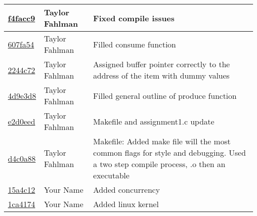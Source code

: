 \begin{tabular}{l l l}
\href{git@github.com:fahlmant/cs444/commit/f4facc9d5a16eb42168ac97078b0f487a08a407c}{f4facc9} & Taylor Fahlman & Fixed compile issues\\\hline
\href{git@github.com:fahlmant/cs444/commit/607fa54aeb02833e23feaaebe3ca42504e86a20c}{607fa54} & Taylor Fahlman & Filled consume function\\\hline
\href{git@github.com:fahlmant/cs444/commit/2244c720455b015276a94f97610bd3e710e41705}{2244c72} & Taylor Fahlman & Assigned buffer pointer correctly to the address of the item with dummy values\\\hline
\href{git@github.com:fahlmant/cs444/commit/4d9e3d84c0309caf5af3ca5aed2af08010b2ef85}{4d9e3d8} & Taylor Fahlman & Filled general outline of produce function\\\hline
\href{git@github.com:fahlmant/cs444/commit/e2d0eedfaec7397cf59d7f1fd46886026f0f1727}{e2d0eed} & Taylor Fahlman & Makefile and assignment1.c update\\\hline
\href{git@github.com:fahlmant/cs444/commit/d4c0a889450f5e33eeee262f56cea203a29aed0a}{d4c0a88} & Taylor Fahlman & Makefile:     Added make file will the most common flags for style and debugging. Used a two step compile process, .o then an executable\\\hline
\href{git@github.com:fahlmant/cs444/commit/15a4c12977816ab8bab1fe5f5a9b3c3774a8367a}{15a4c12} & Your Name & Added concurrency\\\hline
\href{git@github.com:fahlmant/cs444/commit/1ca41740bd9248799f23d5798a4a82d99e63ba5a}{1ca4174} & Your Name & Added linux kernel\\\hline\end{tabular}
